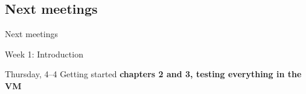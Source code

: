 \documentclass{beamer}
\begin{document}
\subsection{Next meetings}
\begin{frame}
Next meetings
\end{frame}


\begin{frame}{Week 1: Introduction}

\begin{block}{Thursday, 4--4}
Getting started
\textbf{chapters 2 and 3, testing everything in the VM}

\end{block}


\end{frame}
%
%
%
%
%
%	
%	
%
%
\end{document}
